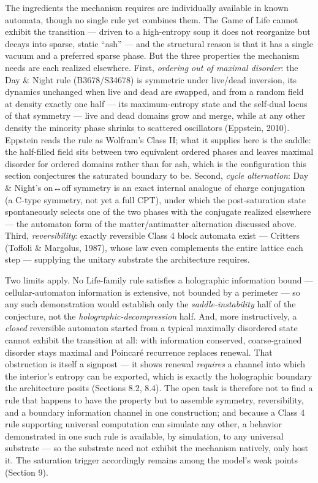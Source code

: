 \documentclass[
]{article}
\begin{document}
The ingredients the mechanism requires are individually available in
known automata, though no single rule yet combines them. The Game of
Life cannot exhibit the transition --- driven to a high-entropy soup it
does not reorganize but decays into sparse, static ``ash'' --- and the
structural reason is that it has a single vacuum and a preferred sparse
phase. But the three properties the mechanism needs are each realized
elsewhere. First, \emph{ordering out of maximal disorder}: the Day \&
Night rule (B3678/S34678) is symmetric under live/dead inversion, its
dynamics unchanged when live and dead are swapped, and from a random
field at density exactly one half --- its maximum-entropy state and the
self-dual locus of that symmetry --- live and dead domains grow and
merge, while at any other density the minority phase shrinks to
scattered oscillators (Eppstein, 2010). Eppstein reads the rule as
Wolfram's Class II; what it supplies here is the saddle: the half-filled
field sits between two equivalent ordered phases and leaves maximal
disorder for ordered domains rather than for ash, which is the
configuration this section conjectures the saturated boundary to be.
Second, \emph{cycle alternation}: Day \& Night's on↔off symmetry is an
exact internal analogue of charge conjugation (a C-type symmetry, not
yet a full CPT), under which the post-saturation state spontaneously
selects one of the two phases with the conjugate realized elsewhere ---
the automaton form of the matter/antimatter alternation discussed above.
Third, \emph{reversibility}: exactly reversible Class 4 block automata
exist --- Critters (Toffoli \& Margolus, 1987), whose law even
complements the entire lattice each step --- supplying the unitary
substrate the architecture requires.

Two limits apply. No Life-family rule satisfies a holographic
information bound --- cellular-automaton information is extensive, not
bounded by a perimeter --- so any such demonstration would establish
only the \emph{saddle-instability} half of the conjecture, not the
\emph{holographic-decompression} half. And, more instructively, a
\emph{closed} reversible automaton started from a typical maximally
disordered state cannot exhibit the transition at all: with information
conserved, coarse-grained disorder stays maximal and Poincaré recurrence
replaces renewal. That obstruction is itself a signpost --- it shows
renewal \emph{requires} a channel into which the interior's entropy can
be exported, which is exactly the holographic boundary the architecture
posits (Sections 8.2, 8.4). The open task is therefore not to find a
rule that happens to have the property but to assemble symmetry,
reversibility, and a boundary information channel in one construction;
and because a Class 4 rule supporting universal computation can simulate
any other, a behavior demonstrated in one such rule is available, by
simulation, to any universal substrate --- so the substrate need not
exhibit the mechanism natively, only host it. The saturation trigger
accordingly remains among the model's weak points (Section 9).
\end{document}
